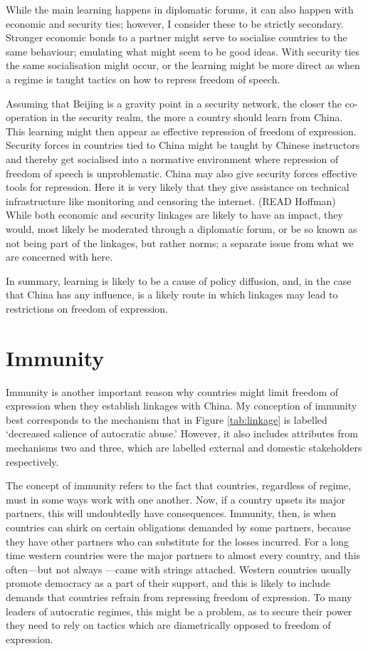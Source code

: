 While the main learning happens in diplomatic forums, it can also happen with economic and security ties; however, I consider these to be strictly secondary. Stronger economic bonds to a partner might serve to socialise countries to the same behaviour; emulating what might seem to be good ideas. With security ties the same socialisation might occur, or the learning might be more direct as when a regime is taught tactics on how to repress freedom of speech. 

Assuming that Beijing is a gravity point in a security network, the closer the co-operation in the security realm, the more a country should learn from China. This learning might then appear as effective repression of freedom of expression. Security forces in countries tied to China might be taught by Chinese instructors and thereby get socialised into a normative environment where repression of freedom of speech is unproblematic. China may also give security forces effective tools for repression. Here it is very likely that they give assistance on technical infrastructure like monitoring and censoring the internet. (READ Hoffman) While both economic and security linkages are likely to have an impact, they would, most likely be moderated through a diplomatic forum, or be so known as not being part of the linkages, but rather norms; a separate issue from what we are concerned with here.

In summary, learning is likely to be a cause of policy diffusion, and, in the case that China has any influence, is a likely route in which linkages may lead to restrictions on freedom of expression.

\section{Immunity}
Immunity is another important reason why countries might limit freedom of expression when they establish linkages with China. My conception of immunity best corresponds to the mechanism that in Figure \ref{tab:linkage} is labelled `decreased salience of autocratic abuse.' However, it also includes attributes from mechanisms two and three, which are labelled external and domestic stakeholders respectively. 

The concept of immunity refers to the fact that countries, regardless of regime, must in some ways work with one another. Now, if a country upsets its major partners, this will undoubtedly have consequences. Immunity, then, is when countries can shirk on certain obligations demanded by some partners, because they have other partners who can substitute for the losses incurred. For a long time western countries were the major partners to almost every country, and this often---but not always \citep{borzel_noble_2015, wong_chinese_2019}---came with strings attached. Western countries usually promote democracy as a part of their support, and this is likely to include demands that countries refrain from repressing freedom of expression. To many leaders of autocratic regimes, this might be a problem, as to secure their power they need to rely on tactics which are diametrically opposed to freedom of expression.

